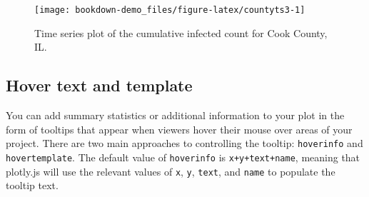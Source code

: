 \documentclass[]{book}
\newenvironment{Shaded}{\begin{snugshade}}{\end{snugshade}}
\newcommand{\KeywordTok}[1]{\textcolor[rgb]{0.13,0.29,0.53}{\textbf{#1}}}
\newcommand{\DataTypeTok}[1]{\textcolor[rgb]{0.13,0.29,0.53}{#1}}
\newcommand{\DecValTok}[1]{\textcolor[rgb]{0.00,0.00,0.81}{#1}}
\newcommand{\StringTok}[1]{\textcolor[rgb]{0.31,0.60,0.02}{#1}}
\newcommand{\CommentTok}[1]{\textcolor[rgb]{0.56,0.35,0.01}{\textit{#1}}}
\newcommand{\OtherTok}[1]{\textcolor[rgb]{0.56,0.35,0.01}{#1}}
\newcommand{\OperatorTok}[1]{\textcolor[rgb]{0.81,0.36,0.00}{\textbf{#1}}}
\newcommand{\NormalTok}[1]{#1}
\begin{document}
\begin{Shaded}
\end{Shaded}

\begin{figure}

{\centering \texttt{[image: bookdown-demo\_files/figure-latex/countyts3-1]} 

}

\caption{Time series plot of the cumulative infected count for Cook County, IL.}\label{fig:countyts3}
\end{figure}

\subsection{Hover text and template}\label{hover-text-and-template}

You can add summary statistics or additional information to your plot in
the form of tooltips that appear when viewers hover their mouse over
areas of your project. There are two main approaches to controlling the
tooltip: \texttt{hoverinfo} and \texttt{hovertemplate}. The default
value of \texttt{hoverinfo} is \texttt{x+y+text+name}, meaning that
plotly.js will use the relevant values of \texttt{x}, \texttt{y},
\texttt{text}, and \texttt{name} to populate the tooltip text.
\end{document}
